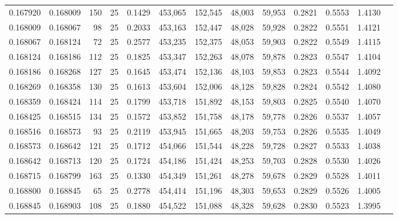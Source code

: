 \begin{tabular}{rrrrrrrrrrrrr}
0.167920 & 0.168009 &   150 &  25 &                                     0.1429 & 453,065 & 152,545 &  48,003 &  59,953 & 0.2821 & 0.5553 & 1.4130 \\
0.168009 & 0.168067 &    98 &  25 &                                     0.2033 & 453,163 & 152,447 &  48,028 &  59,928 & 0.2822 & 0.5551 & 1.4121 \\
0.168067 & 0.168124 &    72 &  25 &                                     0.2577 & 453,235 & 152,375 &  48,053 &  59,903 & 0.2822 & 0.5549 & 1.4115 \\
0.168124 & 0.168186 &   112 &  25 &                                     0.1825 & 453,347 & 152,263 &  48,078 &  59,878 & 0.2823 & 0.5547 & 1.4104 \\
0.168186 & 0.168268 &   127 &  25 &                                     0.1645 & 453,474 & 152,136 &  48,103 &  59,853 & 0.2823 & 0.5544 & 1.4092 \\
0.168269 & 0.168358 &   130 &  25 &                                     0.1613 & 453,604 & 152,006 &  48,128 &  59,828 & 0.2824 & 0.5542 & 1.4080 \\
0.168359 & 0.168424 &   114 &  25 &                                     0.1799 & 453,718 & 151,892 &  48,153 &  59,803 & 0.2825 & 0.5540 & 1.4070 \\
0.168425 & 0.168515 &   134 &  25 &                                     0.1572 & 453,852 & 151,758 &  48,178 &  59,778 & 0.2826 & 0.5537 & 1.4057 \\
0.168516 & 0.168573 &    93 &  25 &                                     0.2119 & 453,945 & 151,665 &  48,203 &  59,753 & 0.2826 & 0.5535 & 1.4049 \\
0.168573 & 0.168642 &   121 &  25 &                                     0.1712 & 454,066 & 151,544 &  48,228 &  59,728 & 0.2827 & 0.5533 & 1.4038 \\
0.168642 & 0.168713 &   120 &  25 &                                     0.1724 & 454,186 & 151,424 &  48,253 &  59,703 & 0.2828 & 0.5530 & 1.4026 \\
0.168715 & 0.168799 &   163 &  25 &                                     0.1330 & 454,349 & 151,261 &  48,278 &  59,678 & 0.2829 & 0.5528 & 1.4011 \\
0.168800 & 0.168845 &    65 &  25 &                                     0.2778 & 454,414 & 151,196 &  48,303 &  59,653 & 0.2829 & 0.5526 & 1.4005 \\
0.168845 & 0.168903 &   108 &  25 &                                     0.1880 & 454,522 & 151,088 &  48,328 &  59,628 & 0.2830 & 0.5523 & 1.3995 \\

\end{tabular}
